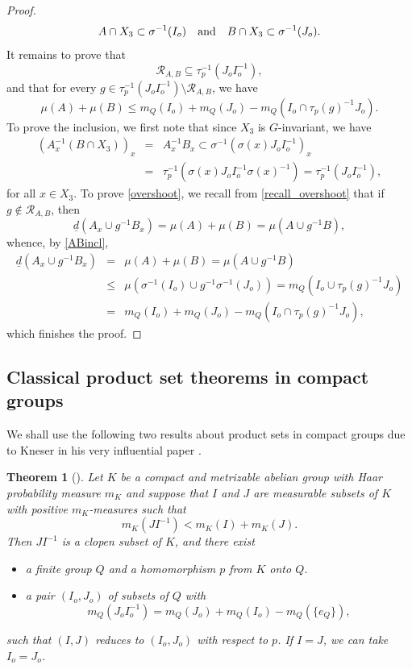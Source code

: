 \documentclass[10pt]{amsart}
\let\mathcal\mathscr
\newcommand{\cR}{\mathcal{R}}
\newcommand{\qand}{\quad\textup{and}\quad}
\theoremstyle{plain}
\newtheorem{theorem}{Theorem}[section]
\theoremstyle{definition}
\begin{document}
\begin{proof}
\begin{equation}
\label{ABincl}
A \cap X_3 \subset \sigma^{-1}(I_o) \qand B \cap X_3 \subset \sigma^{-1}(J_o).
\end{equation}
It remains to prove that
\[
\cR_{A,B} \subseteq \tau_p^{-1}(J_o I_o^{-1}),
\]
and that for every $g \in \tau_p^{-1}(J_o I_o^{-1}) \setminus \cR_{A,B}$, we have
\begin{equation}
\label{overshoot}
\mu(A) + \mu(B) \leq m_Q(I_o) + m_Q(J_o) - m_Q(I_o \cap \tau_p(g)^{-1}J_o).
\end{equation}
To prove the inclusion, we first note that since $X_3$ is $G$-invariant, we have
\begin{eqnarray*}
(A_x^{-1}(B \cap X_3))_x
&=&
A_x^{-1} B_x \subset \sigma^{-1}(\sigma(x)J_o I_o^{-1})_x \\
&=& \tau_p^{-1}(\sigma(x)J_o I_o^{-1}\sigma(x)^{-1}) = \tau_p^{-1}(J_o I_o^{-1}),
\end{eqnarray*}
for all $x \in X_3$. To prove \eqref{overshoot}, we recall from \eqref{recall_overshoot} that if $g \notin \cR_{A,B}$, then
\[
\underline{d}(A_x \cup g^{-1}B_x)
= \mu(A) + \mu(B) = \mu(A \cup g^{-1}B),
\]
whence, by \eqref{ABincl},
\begin{eqnarray*}
\underline{d}(A_x \cup g^{-1}B_x)
&=& \mu(A) + \mu(B) = \mu(A \cup g^{-1}B) \\
&\leq &
\mu(\sigma^{-1}(I_o) \cup g^{-1} \sigma^{-1}(J_o))
=
m_Q(I_o \cup \tau_p(g)^{-1}J_o) \\
&=&
m_Q(I_o) + m_Q(J_o) - m_Q(I_o \cap \tau_p(g)^{-1}J_o),
\end{eqnarray*}
which finishes the proof.
\end{proof}

\subsection{Classical product set theorems in compact groups}

We shall use the following two results about product sets in compact groups due to Kneser in his very influential paper \cite{Kneser}.

\begin{theorem}[{\cite[Satz\,1]{Kneser}}]
\label{thm_Kneser1}
Let $K$ be a compact and metrizable abelian group with Haar probability measure $m_K$ and suppose that $I$ and $J$ are measurable subsets of $K$
with positive $m_K$-measures such that
\[
m_K(JI^{-1}) < m_K(I) + m_K(J).
\]
Then $JI^{-1}$ is a clopen subset of $K$, and there exist

\begin{itemize}
\item a finite group $Q$ and a homomorphism $p$ from $K$ onto $Q$.
\item a pair $(I_o,J_o)$ of subsets of $Q$ with
\[
m_Q(J_o I_o^{-1}) = m_Q(J_o) + m_Q(I_o) - m_Q(\{e_Q\}),
\]
\end{itemize}
such that $(I,J)$ reduces to $(I_o,J_o)$ with respect to $p$. If $I = J$, we can take $I_o = J_o$.
\end{theorem}
\end{document}
